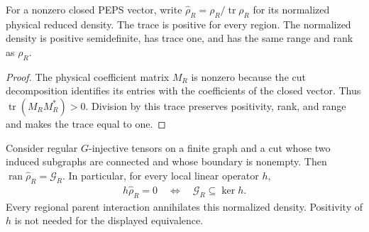 \begin{definition}%
    \label{def:peps_normalized_region_reduced_density}
    \leanok
    For a nonzero closed PEPS vector, write
    $\widehat\rho_R=\rho_R/\operatorname{tr}\rho_R$ for its normalized
    physical reduced density. The trace is positive for every region.
    The normalized density is positive semidefinite, has trace one,
    and has the same range and rank as $\rho_R$.
\end{definition}

\begin{proof}\leanok
    The physical coefficient matrix $M_R$ is nonzero because the cut decomposition
    identifies its entries with the coefficients of the closed vector.
    Thus $\operatorname{tr}(M_RM_R^*)>0$. Division by this trace preserves
    positivity, rank, and range and makes the trace equal to one.
\end{proof}

\begin{lemma}%
    \label{thm:peps_normalized_regular_region_support}
    \leanok
    Consider regular $G$-injective tensors on a finite graph and a cut
    whose two induced subgraphs are connected and whose boundary is
    nonempty. Then
    $\operatorname{ran}\widehat\rho_R=\mathcal G_R$. In particular, for
    every local linear operator $h$,
    \begin{align}
        h\widehat\rho_R=0
        \quad\Longleftrightarrow\quad
        \mathcal G_R\subseteq\ker h.
    \end{align}
    Every regional parent interaction annihilates this normalized
    density. Positivity of $h$ is not needed for the displayed
    equivalence.
\end{lemma}

